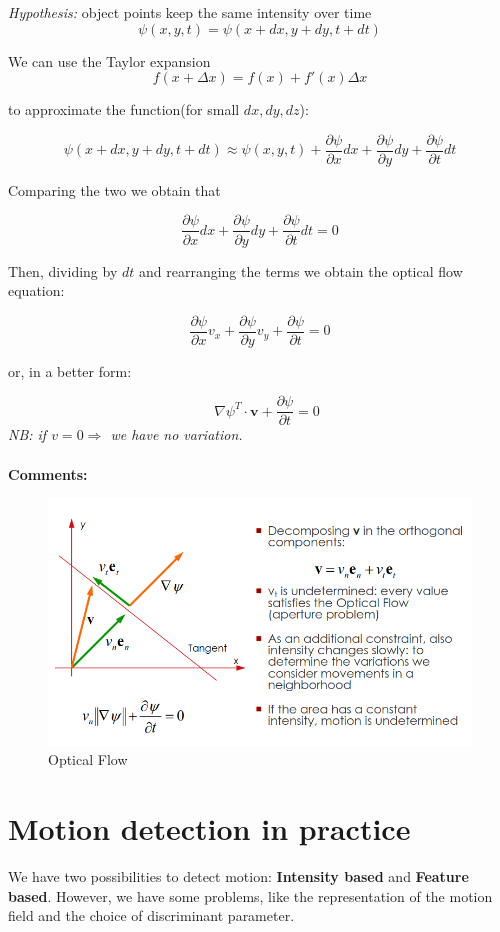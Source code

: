 \textit{Hypothesis:} object points keep the same intensity over time\\

\[
    \psi(x,y,t) = \psi(x + dx, y + dy, t + dt)
\]

We can use the Taylor expansion\[f(x + \Delta x) =f(x)+f'(x)\Delta x\] 

to approximate the function(for small $dx, dy, dz$):

\[
    \psi(x + dx, y + dy, t + dt) \approx \psi(x,y,t) + \frac{\partial \psi}{\partial x}dx + \frac{\partial \psi}{\partial y}dy + \frac{\partial \psi}{\partial t}dt
\]

Comparing the two we obtain that 

\[
    \frac{\partial \psi}{\partial x}dx + \frac{\partial \psi}{\partial y}dy + \frac{\partial \psi}{\partial t}dt = 0
\]

Then, dividing by $dt$ and rearranging the terms we obtain the optical flow equation:

\[
    \frac{\partial \psi}{\partial x}v_x + \frac{\partial \psi}{\partial y}v_y + \frac{\partial \psi}{\partial t} = 0 
\]

or, in a better form:

\[
    \quad \nabla \psi ^{T} \cdot \mathbf{v} + \frac{\partial \psi}{\partial t} = 0
\]
\textit{NB: if $v=0 \Rightarrow$ we have no variation.}\\
\\\textbf{Comments:}
\begin{figure}[H]
    \centering
    \includegraphics[scale=0.45]{Figures/OpticalFlow.png}
    \caption{Optical Flow}
\end{figure}
\section{Motion detection in practice}
We have two possibilities to detect motion: \textbf{Intensity based} and \textbf{Feature based}. However, we have some problems, like the representation of the motion field and the choice of discriminant parameter.
